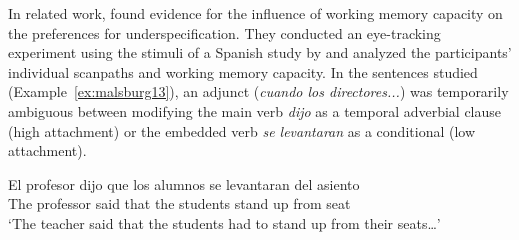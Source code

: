 \documentclass{cambridge7A}\usepackage[]{graphicx}\usepackage[]{color}
\begin{document}




In related work, \cite{MalsburgVasishth2013} found evidence for the influence of working memory capacity on the preferences for underspecification.
They conducted an eye-tracking experiment using the stimuli of a Spanish study by \cite{MeseguerCarreirasClifton2002} and analyzed the participants' individual scanpaths \citep{MalsburgVasishth2011} and working memory capacity. 
In the sentences studied (Example~\ref{ex:malsburg13}), an adjunct (\textit{cuando los directores...}) was temporarily ambiguous between modifying the main verb \textit{dijo} as a temporal adverbial clause (high attachment) or the embedded verb \textit{se levantaran} as a conditional (low attachment). 

\begin{exe}
\ex\label{ex:malsburg13preamble} 
\gll El profesor dijo que los alumnos {se levantaran} del asiento\\
     The professor said that the students {stand up} from seat \\
\glt `The teacher said that the students had to stand up from their seats\dots'
\end{exe}
\end{document}
